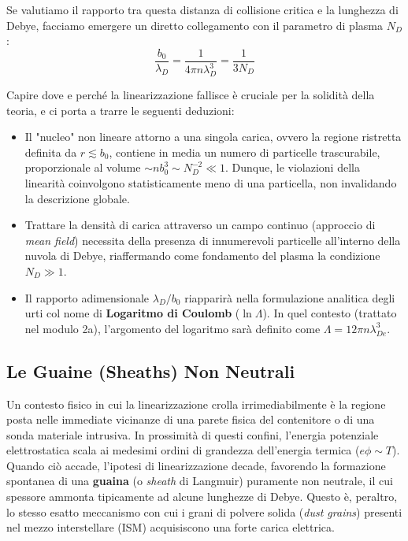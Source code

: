Se valutiamo il rapporto tra questa distanza di collisione critica e la lunghezza di Debye, facciamo emergere un diretto collegamento con il parametro di plasma $N_D$:
\begin{equation}
\frac{b_0}{\lambda_D} = \frac{1}{4\pi n \lambda_D^3} = \frac{1}{3 N_D}
\end{equation}

Capire dove e perché la linearizzazione fallisce è cruciale per la solidità della teoria, e ci porta a trarre le seguenti deduzioni:
\begin{itemize}
\item Il "nucleo" non lineare attorno a una singola carica, ovvero la regione ristretta definita da $r \lesssim b_0$, contiene in media un numero di particelle trascurabile, proporzionale al volume $\sim n b_0^3 \sim N_D^{-2} \ll 1$. Dunque, le violazioni della linearità coinvolgono statisticamente meno di una particella, non invalidando la descrizione globale.
\item Trattare la densità di carica attraverso un campo continuo (approccio di \textit{mean field}) necessita della presenza di innumerevoli particelle all'interno della nuvola di Debye, riaffermando come fondamento del plasma la condizione $N_D \gg 1$.
\item Il rapporto adimensionale $\lambda_D/b_0$ riapparirà nella formulazione analitica degli urti col nome di \textbf{Logaritmo di Coulomb} ($\ln \Lambda$). In quel contesto (trattato nel modulo 2a), l'argomento del logaritmo sarà definito come $\Lambda = 12\pi n \lambda_{De}^3$.
\end{itemize}

\subsection{Le Guaine (Sheaths) Non Neutrali}
Un contesto fisico in cui la linearizzazione crolla irrimediabilmente è la regione posta nelle immediate vicinanze di una parete fisica del contenitore o di una sonda materiale intrusiva. In prossimità di questi confini, l'energia potenziale elettrostatica scala ai medesimi ordini di grandezza dell'energia termica ($e\phi \sim T$). Quando ciò accade, l'ipotesi di linearizzazione decade, favorendo la formazione spontanea di una \textbf{guaina} (o \textit{sheath} di Langmuir) puramente non neutrale, il cui spessore ammonta tipicamente ad alcune lunghezze di Debye. Questo è, peraltro, lo stesso esatto meccanismo con cui i grani di polvere solida (\textit{dust grains}) presenti nel mezzo interstellare (ISM) acquisiscono una forte carica elettrica.

